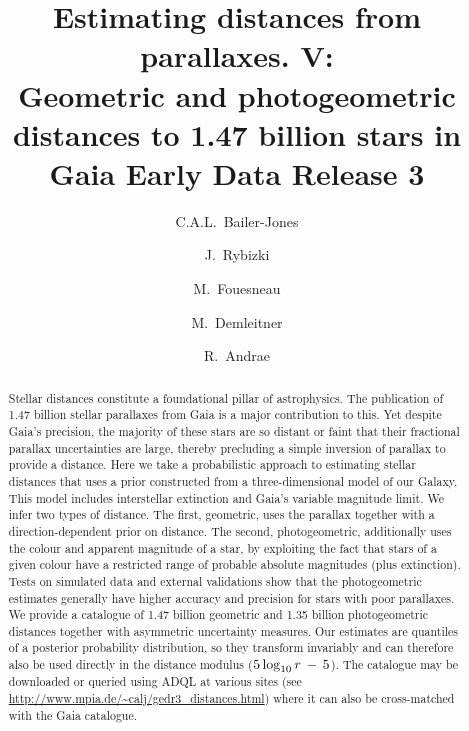 \documentclass[twocolumn]{aastex62}
\providecommand{\logten}{\ensuremath{\log_{\rm 10}}}
\providecommand{\logten}{\ensuremath{\log_{\rm 10}}}
\providecommand{\dist}{\ensuremath{r}}
\begin{document}

\title{Estimating distances from parallaxes. V:\\
Geometric and photogeometric distances to 1.47 billion stars in Gaia Early Data Release 3
}


\author{C.A.L.\ Bailer-Jones}

\author{J.\ Rybizki}

\author[0000-0001-9256-5516]{M.\ Fouesneau}

\author{M.\ Demleitner}

\author{R.\ Andrae}

\begin{abstract}
Stellar distances constitute a foundational pillar of astrophysics. The publication of 1.47 billion stellar parallaxes from Gaia is a major contribution to this. Yet despite Gaia's precision, the majority of these stars are so distant or faint that their fractional parallax uncertainties are large, thereby precluding a simple inversion of parallax to provide a distance. Here we take a probabilistic approach to estimating stellar distances that uses a prior constructed from a three-dimensional model of our Galaxy. This model includes interstellar extinction and Gaia's variable magnitude limit. We infer two types of distance. The first, geometric, uses the parallax together with a direction-dependent prior on distance. The second, photogeometric, additionally uses the colour and apparent magnitude of a star, by exploiting the fact that stars of a given colour have a restricted range of probable absolute magnitudes (plus extinction). Tests on simulated data and external validations show that the photogeometric estimates generally have higher accuracy and precision for stars with poor parallaxes. We provide a catalogue of 1.47 billion geometric and 1.35 billion 
photogeometric distances together with asymmetric uncertainty measures. Our estimates are quantiles of a posterior probability distribution, so they transform invariably and can therefore also be used directly in the distance modulus ($5\logten\dist\,-\,5$). The catalogue may be downloaded or queried using ADQL at various sites (see \url{http://www.mpia.de/~calj/gedr3_distances.html}) where it can also be cross-matched with the Gaia catalogue.
\end{abstract}
\end{document}
